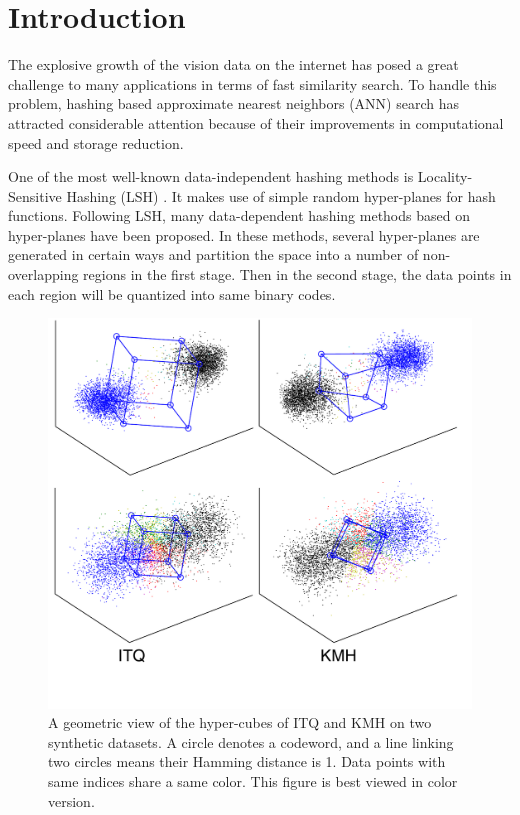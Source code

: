 \documentclass{article}
\begin{document}
\section{Introduction}
\label{sec:intro}

The explosive growth of the vision data on the internet has posed a great challenge to many applications in terms of fast similarity search. To handle this problem, hashing based approximate nearest neighbors (ANN) search has attracted considerable attention because of their improvements in computational speed and storage reduction.

One of the most well-known data-independent hashing methods is Locality-Sensitive Hashing (LSH) \cite{gionis1999similarity}. It makes use of simple random
hyper-planes for hash functions. Following LSH, many data-dependent hashing methods \cite{gong2013iterative,wang2012semi} based on hyper-planes have
been proposed.
In these methods, several hyper-planes are generated in certain ways and partition the space into a number of non-overlapping regions in the
first stage. Then in the second stage, the data points in each region will be quantized into same binary codes.
\begin{figure}[ht]
	\vskip 0.2in
	\begin{center}
		\centerline{\includegraphics[width=0.76\columnwidth]{geometricview}}
		\caption{A geometric view of the hyper-cubes of ITQ and KMH on two synthetic datasets. A circle denotes a codeword, and a line
			linking two circles means their Hamming distance is 1. Data points with same indices share a same color. This figure is best viewed in color version.}
		\label{kmh_geo}
	\end{center}
	\vskip -0.2in
\end{figure}
\end{document}

